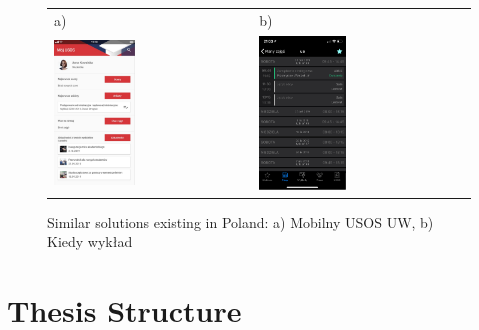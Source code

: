 
\begin{figure}[htb]
    \centering
    \begin{tabular}{@{}ll@{}}
        a) & b) \\
        \includegraphics[width=0.425\textwidth]{fig01/mobilny-usos.png} &
        \includegraphics[width=0.425\textwidth]{fig01/kiedy-wyklad.png} \\
    \end{tabular}
    \caption{Similar solutions existing in Poland: a) Mobilny USOS UW, b) Kiedy wykład} \label{fig:similiar-solutions}
\end{figure}

\section{Thesis Structure}

